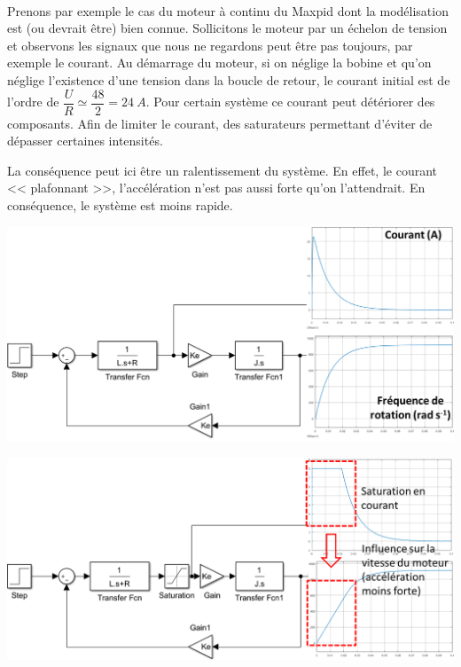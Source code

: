 \documentclass[10pt,fleqn]{article} %
\begin{document}
\begin{exemple} ~\\

\begin{minipage}[c]{.48\linewidth}
Prenons par exemple le cas du moteur à continu du Maxpid dont la modélisation est (ou devrait être)  bien connue. Sollicitons le moteur par un échelon de tension et observons les signaux que nous ne regardons peut être pas toujours, par exemple le courant. 
Au démarrage du moteur, si on néglige la bobine et qu'on néglige l'existence d'une tension dans la boucle de retour, le courant initial est de l'ordre de $\dfrac{U}{R}\simeq \dfrac{48}{2}=\SI{24}{A}$. Pour certain système ce courant peut détériorer des composants. Afin de limiter le courant, des saturateurs permettant d'éviter de dépasser certaines intensités. 

La conséquence peut ici être un ralentissement du système. En effet, le courant << plafonnant >>, l'accélération n'est pas aussi forte qu'on l'attendrait. En conséquence, le système est moins rapide. 
\end{minipage}
\hfill
\begin{minipage}[c]{.48\linewidth}
\begin{center}
\includegraphics[width=.9\linewidth]{images/Modele_MCC}

\includegraphics[width=.9\linewidth]{images/Modele_MCC_sat}
\end{center}
\end{minipage}

\end{exemple}
\end{document}
